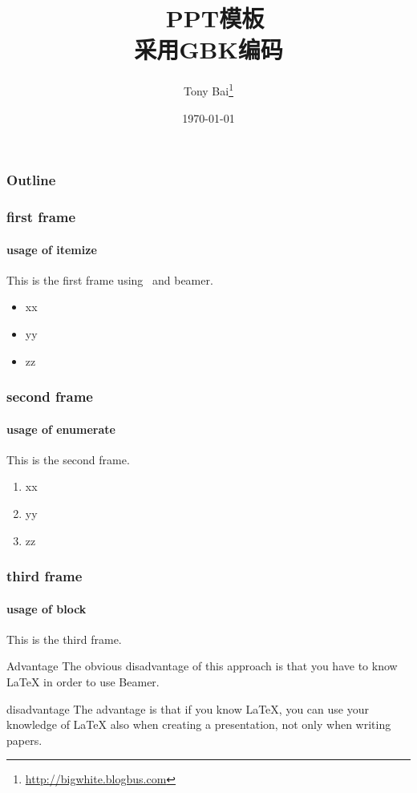 \documentclass{beamer}
\title{\XeTeX~PPT模板\\采用GBK编码}
\author{Tony Bai\footnote{\url{http://bigwhite.blogbus.com}}}
\date{\today}
\begin{document}
\begin{frame}
\titlepage
\end{frame}

\begin{frame}
\frametitle{Outline}
\tableofcontents
\end{frame}

\begin{frame}
\frametitle{first frame}
\framesubtitle{usage of itemize}
    This is the first frame using \XeTeX~and beamer.
    \begin{itemize}
        \item<1-> xx
        \item<2-> yy
        \item<3-> zz
    \end{itemize}
\end{frame}

\begin{frame}
\frametitle{second frame}
\framesubtitle{usage of enumerate}
    This is the second frame.
    \begin{enumerate}
        \item<1-> xx
        \item<2-> yy
        \item<3-> zz
    \end{enumerate}
\end{frame}

\begin{frame}
\frametitle{third frame}
\framesubtitle{usage of block}
    This is the third frame.
    \begin{block}{Advantage}
        The obvious disadvantage of this approach is that you have to know LaTeX in order to use Beamer. 
    \end{block}
    \begin{block}{disadvantage}
        The advantage is that if you know LaTeX, you can use your knowledge of LaTeX also when creating a presentation, not only when writing papers.
    \end{block}
\end{frame}
\end{document}

